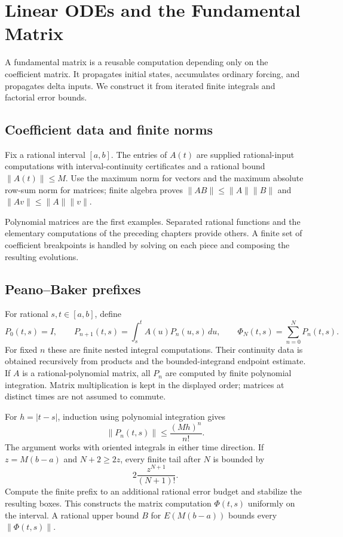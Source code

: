 \chapter{Linear ODEs and the Fundamental Matrix}
\label{ch:differential-equations}

A fundamental matrix is a reusable computation depending only on the
coefficient matrix.  It propagates initial states, accumulates ordinary
forcing, and propagates delta inputs.  We construct it from iterated finite
integrals and factorial error bounds.

\section{Coefficient data and finite norms}
Fix a rational interval $[a,b]$.  The entries of $A(t)$ are supplied
rational-input computations with interval-continuity certificates and a
rational bound $\|A(t)\|\le M$.  Use the maximum norm for vectors and the
maximum absolute row-sum norm for matrices; finite algebra proves
$\|AB\|\le\|A\|\|B\|$ and $\|Av\|\le\|A\|\|v\|$.

Polynomial matrices are the first examples.  Separated rational functions
and the elementary computations of the preceding chapters provide others.
A finite set of coefficient breakpoints is handled by solving on each
piece and composing the resulting evolutions.

\section{Peano--Baker prefixes}
For rational $s,t\in[a,b]$, define
\[
 P_0(t,s)=I,\qquad P_{n+1}(t,s)=\int_s^t A(u)P_n(u,s)\,du,
 \qquad \Phi_N(t,s)=\sum_{n=0}^NP_n(t,s).
\]
For fixed $n$ these are finite nested integral computations.  Their
continuity data is obtained recursively from products and the
bounded-integrand endpoint estimate.  If $A$ is a rational-polynomial
matrix, all $P_n$ are computed by finite polynomial integration.
Matrix multiplication is kept in the displayed order; matrices at distinct
times are not assumed to commute.

For $h=|t-s|$, induction using polynomial integration gives
\[
 \|P_n(t,s)\|\le\frac{(Mh)^n}{n!}.
\]
The argument works with oriented integrals in either time direction.
If $z=M(b-a)$ and $N+2\ge2z$, every finite tail after $N$ is bounded by
\[
 \boxed{2\frac{z^{N+1}}{(N+1)!}.}
\]
Compute the finite prefix to an additional rational error budget and
stabilize the resulting boxes.  This constructs the matrix computation
$\Phi(t,s)$ uniformly on the interval.  A rational upper bound $B$ for
$E(M(b-a))$ bounds every $\|\Phi(t,s)\|$.

